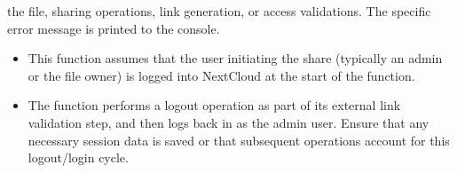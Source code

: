 \documentclass[letterpaper,10pt,english]{sphinxmanual}
\begin{document}
\begin{fulllineitems}
\begin{description}
\begin{description}
\sphinxAtStartPar
the file, sharing operations, link generation, or access validations. The specific error message
is printed to the console.

\end{description}

\begin{sphinxVerbatim}[commandchars=\\\{\}]
   
  
  
  
  
     
 
    
    
\end{sphinxVerbatim}

\begin{itemize}
\item {} 
\sphinxAtStartPar
This function assumes that the user initiating the share (typically an admin or the file owner) is
logged into NextCloud at the start of the function.

\item {} 
\sphinxAtStartPar
The function performs a logout operation as part of its external link validation step, and then logs
back in as the admin user. Ensure that any necessary session data is saved or that subsequent operations
account for this logout/login cycle.

\end{itemize}

\end{description}

\end{fulllineitems}
\end{document}
